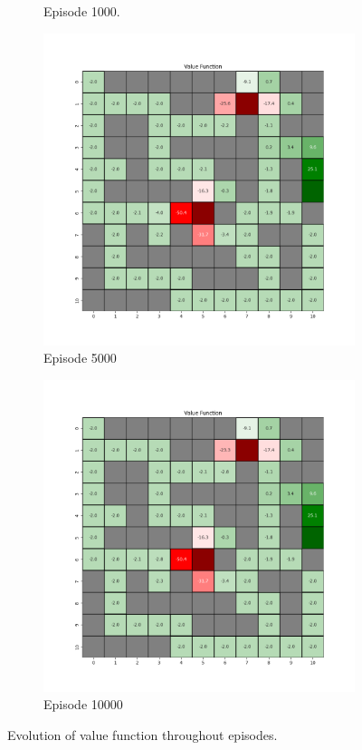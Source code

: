 \documentclass{assignment}
\begin{document}
\begin{figure}[H]
\begin{subfigure}{0.3\textwidth}
    \caption{Episode 1000.}
    \end{subfigure}\hfill
    \begin{subfigure}{0.3\textwidth}
        \includegraphics[width=\textwidth]{figures/value_td/gamma_sweep/value_function_alpha_0.1_gamma_0.5_epsilon_0.2_iteration_5000.png}
    \caption{Episode 5000}
    \end{subfigure}\hfill
    \begin{subfigure}{0.3\textwidth}
        \includegraphics[width=\textwidth]{figures/value_td/gamma_sweep/value_function_alpha_0.1_gamma_0.5_epsilon_0.2_iteration_10000.png}
    \caption{Episode 10000}
    \end{subfigure}
    \caption{Evolution of value function throughout episodes.}
    \label{fig:gamma_0.5_td_learning_value}
\end{figure}
\end{document}

